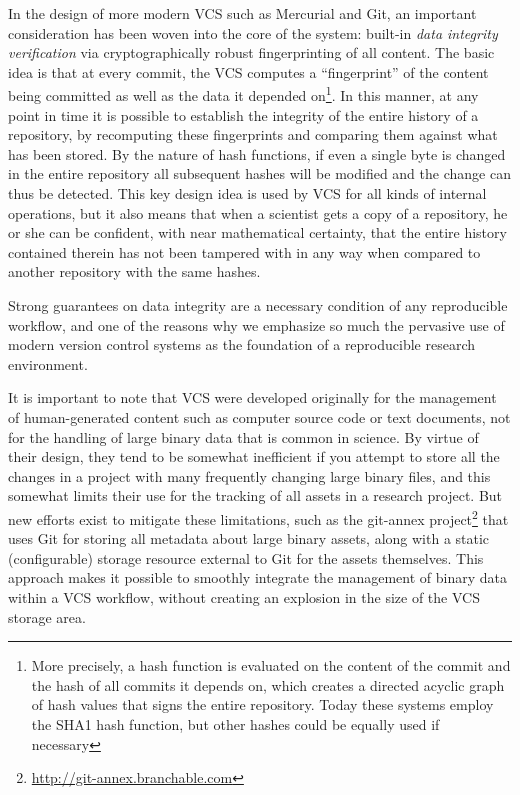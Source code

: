 \documentclass[ChapterTOCs,krantz2]{krantz} %
\theoremstyle{definition}
\begin{document}
In the design of more modern VCS such as Mercurial and Git, an important
consideration has been woven into the core of the system: built-in \emph{data
  integrity verification} via cryptographically robust fingerprinting of all
content.  The basic idea is that at every commit, the VCS computes a
``fingerprint'' of the content being committed as well as the data it depended
on\footnote{More precisely, a hash function is evaluated on the content of the
  commit and the hash of all commits it depends on, which creates a directed
  acyclic graph of hash values that signs the entire repository.  Today these
  systems employ the SHA1 hash function, but other hashes could be equally used
  if necessary}.  In this manner, at any point in time it is possible to
establish the integrity of the entire history of a repository, by recomputing
these fingerprints and comparing them against what has been stored.  By the
nature of hash functions, if even a single byte is changed in the entire
repository all subsequent hashes will be modified and the change can thus be
detected.  This key design idea is used by VCS for all kinds of internal
operations, but it also means that when a scientist gets a copy of a
repository, he or she can be confident, with near mathematical certainty, that
the entire history contained therein has not been tampered with in any way when
compared to another repository with the same hashes.  

Strong guarantees on data integrity are a necessary condition of any
reproducible workflow, and one of the reasons why we emphasize so much the
pervasive use of modern version control systems as the foundation of a
reproducible research environment.

It is important to note that VCS were developed originally for the
management of human-generated content such as computer source code or text
documents, not for the handling of large binary data that is common in science.
By virtue of their design, they tend to be somewhat inefficient if you attempt
to store all the changes in a project with many frequently changing large
binary files, and this somewhat limits their use for the tracking of all assets
in a research project.  But new efforts exist to mitigate these limitations,
such as the git-annex project\footnote{\url{http://git-annex.branchable.com}}
that uses Git for storing all metadata about large binary assets, along
with a static (configurable) storage resource external to Git for the assets
themselves.  This approach makes it possible to smoothly integrate the
management of binary data within a VCS workflow, without creating an explosion
in the size of the VCS storage area.
\end{document}
